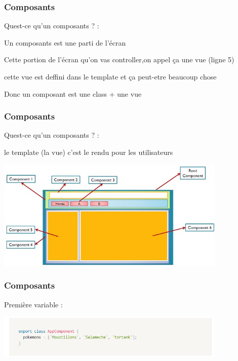 \documentclass[10pt]{beamer}
\begin{document}

	\begin{frame}
		\frametitle{Composants}

		Quest-ce qu'un composants ? : \newline \newline

		Un composants est une parti de l'écran \newline \newline

		Cette portion de l’écran qu’on vas controller,\newline on appel ça une vue  (ligne 5) \newline \newline

		cette vue est deffini dans le template et ça peut-etre beaucoup chose \newline \newline

		Donc un composant est une class + une vue
	\end{frame}

	\begin{frame}
		\frametitle{Composants}

		Quest-ce qu'un composants ? : \newline \newline

		le template (la vue) c'est le rendu pour les utilisateurs

		\centering
		\includegraphics[width=11cm]{assets/composant} \newline


	\end{frame}

	\begin{frame}
		\frametitle{Composants}

		Première variable : \newline \newline

		\centering
		\includegraphics[width=11cm]{assets/tableauComposant} \newline

	\end{frame}
\end{document}
